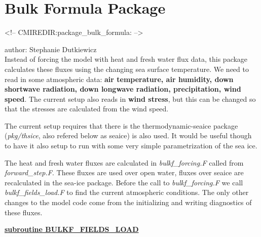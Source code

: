 % 
% 
% 
% 
% 

\def\deg{$^o$}
\section{Bulk Formula Package}
\label{sec:pkg:bulk_formula}
\begin{rawhtml}
<!-- CMIREDIR:package_bulk_formula: -->
\end{rawhtml}

author: Stephanie Dutkiewicz\\

\noindent
Instead of forcing the model with heat and fresh water flux data,
this package calculates these fluxes using the changing sea surface
temperature. We need to read in some atmospheric data:
{\bf air temperature, air humidity, down shortwave radiation,
     down longwave radiation, precipitation, wind speed}.
The current setup also reads in {\bf wind stress}, but this
can be changed so that the stresses are calculated from the
wind speed.

The current setup requires that there is the thermodynamic-seaice package
({\it pkg/thsice}, also refered below as seaice)
is also used. It would be useful though to have it also
setup to run with some very simple parametrization of the sea ice.


\vspace{1cm}

\noindent
The heat and fresh water fluxes are calculated in {\it bulkf\_forcing.F}
called from {\it forward\_step.F}. These fluxes are used over open water,
fluxes over seaice are recalculated in the sea-ice package.
Before the call to {\it bulkf\_forcing.F} we call 
{\it bulkf\_fields\_load.F} to find the current atmospheric conditions.
The only other changes to the model code come from the initializing
and writing diagnostics of these fluxes.

\vspace{1cm}
\noindent
{\bf \underline{subroutine BULKF\_FIELDS\_LOAD}}

